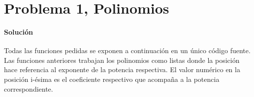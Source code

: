\section{Problema 1, Polinomios}

  \paragraph{Solución}
  Todas las funciones pedidas se exponen a continuación
  en un único código fuente.
  Las funciones anteriores trabajan los polinomios como listas
  donde la posición hace referencia al exponente de la potencia
  respectiva.
  El valor numérico en la posición i-ésima es el coeficiente
  respectivo que acompaña a la potencia correspondiente.
  
  
